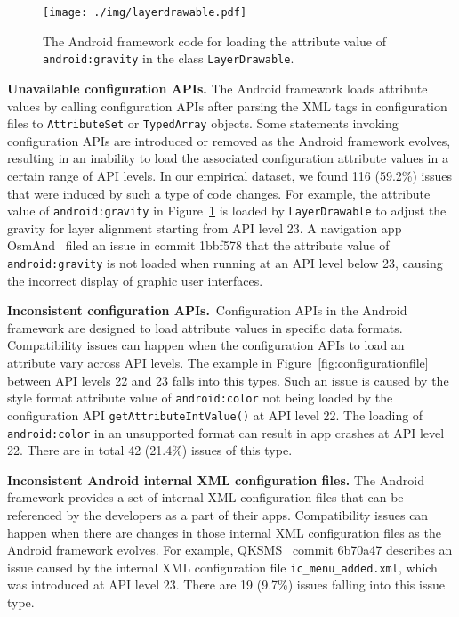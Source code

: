 \begin{figure}[t]
	\centering
	\texttt{[image: ./img/layerdrawable.pdf]}
	\caption{The Android framework code for loading the attribute value of \texttt{android:gravity} in the class \texttt{LayerDrawable}.}
	\label{fig:layerdrawable}
\end{figure}
\textbf{Unavailable configuration APIs.}
The Android framework loads attribute values by calling configuration APIs after parsing the XML tags in configuration files to \texttt{AttributeSet} or \texttt{TypedArray} objects.
Some statements invoking configuration APIs are introduced or removed as the Android framework evolves, resulting in an inability to load the associated configuration attribute values in a certain range of API levels.
In our empirical dataset, we found 116 (59.2\%) issues that were induced by such a type of code changes.
For example, the attribute value of \texttt{android:gravity} in Figure~\ref{fig:layerdrawable} is loaded by \texttt{LayerDrawable} to adjust the gravity for layer alignment starting from API level 23.
A navigation app OsmAnd~\cite{osmand} filed an issue in commit 1bbf578 that the attribute value of \texttt{android:gravity} is not loaded when running at an API level below 23, causing the incorrect display of graphic user interfaces. %

\textbf{Inconsistent configuration APIs.}~Configuration APIs in the Android framework are designed to load attribute values in specific data formats.
Compatibility issues can happen when the configuration APIs to load an attribute vary across API levels.
The example in Figure~\ref{fig:configurationfile} between API levels 22 and 23 falls into this types.
Such an issue is caused by the style format attribute value of \texttt{android:color} not being loaded by the configuration API \texttt{getAttributeIntValue()} at API level 22.
The loading of \texttt{android:color} in an unsupported format can result in app crashes at API level 22. 
There are in total 42 (21.4\%) issues of this type.

\textbf{Inconsistent Android internal XML configuration files.}
The Android framework provides a set of internal XML configuration files that can be referenced by the developers as a part of their apps.
Compatibility issues can happen when there are changes in those internal XML configuration files as the Android framework evolves.
For example, QKSMS~\cite{qksms} commit 6b70a47 describes an issue caused by the internal XML configuration file \texttt{ic\_menu\_added.xml}, which was introduced at API level 23. There are 19 (9.7\%) issues falling into this issue type.

